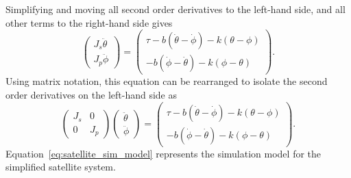 Simplifying and moving all second order derivatives to the left-hand side, and all other terms to the right-hand side gives
\[
\begin{pmatrix}
J_s\ddot{\theta} \\
J_p\ddot{\phi}
\end{pmatrix}
= \begin{pmatrix}  \tau -b(\dot{\theta}-\dot{\phi})-k(\theta-\phi) \\ -b(\dot{\phi}-\dot{\theta}) - k(\phi-\theta) \end{pmatrix}.
\]
Using matrix notation, this equation can be rearranged to isolate the second order derivatives on the left-hand side as
\begin{equation}\label{eq:satellite_sim_model}
\begin{pmatrix}
J_s & 0 \\ 
0 & J_p
\end{pmatrix} \begin{pmatrix}\ddot{\theta} \\ \ddot{\phi} \end{pmatrix}
= \begin{pmatrix} \tau-b(\dot{\theta}-\dot{\phi})-k(\theta-\phi) \\ -b(\dot{\phi}-\dot{\theta}) - k(\phi-\theta) \end{pmatrix}.
\end{equation}
Equation~\eqref{eq:satellite_sim_model} represents the simulation model for the simplified satellite system.
